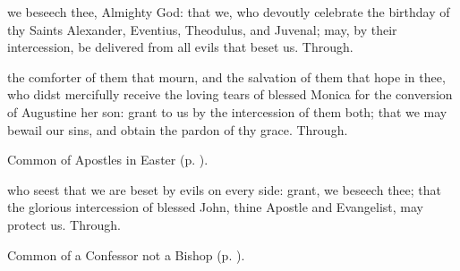 \memorialCollect\label{AlexanderEtcCollect}
 we beseech thee, Almighty God: that we, who devoutly celebrate the birthday of thy Saints Alexander, Eventius, Theodulus, and Juvenal; may, by their intercession, be delivered from all evils that beset us. Through.


\clearpage
{}


\memorialCollect
{} the comforter of them that mourn, and the salvation of them that hope in thee, who didst mercifully receive the loving tears of blessed Monica for the conversion of Augustine her son: grant to us by the intercession of them both; that we may bewail our sins, and obtain the pardon of thy grace. Through.



\begin{rubric}
	Common of Apostles in Easter (p. \pageref{CommonApostlesEaster}).
\end{rubric}



\collect
{} who seest that we are beset by evils on every side: grant, we beseech thee; that the glorious intercession of blessed John, thine Apostle and Evangelist, may protect us. Through.



\begin{rubric}
	Common of a Confessor not a Bishop (p. \pageref{ConfessorNotBishopCollect}).
\end{rubric}



